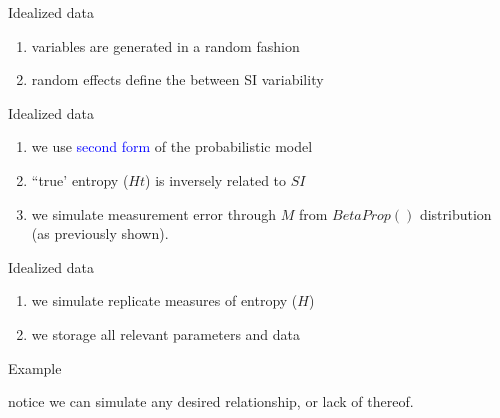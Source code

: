 %
%
\begin{lhframe}[rhgraphic={\texttt{[image: sim\_code2.png]}}]
	{Idealized data}
	
	\begin{enumerate}
		\item variables are generated in a random fashion 
		\item random effects define the between SI variability
	\end{enumerate}
\end{lhframe}
%
%
\begin{lhframe}[rhgraphic={\texttt{[image: sim\_code3.png]}}]
	{Idealized data}
	
	\begin{enumerate}
		\item we use \textcolor{blue}{second form} of the probabilistic model
		\item ``true' entropy ($Ht$) is inversely related to $SI$
		\item we simulate measurement error through $M$ from $BetaProp()$ distribution (as previously shown).
	\end{enumerate}
\end{lhframe}
%
%
\begin{lhframe}[rhgraphic={\texttt{[image: sim\_code4.png]}}]
	{Idealized data}
	
	\begin{enumerate}
		\item we simulate replicate measures of entropy ($H$)
		\item we storage all relevant parameters and data
	\end{enumerate}
\end{lhframe}
%
%
\begin{lhframe}[rhgraphic={\texttt{[image: data\_example.pdf]}}]
	{Example}
	
	notice we can simulate any desired relationship, or lack of thereof.
\end{lhframe}
%
%